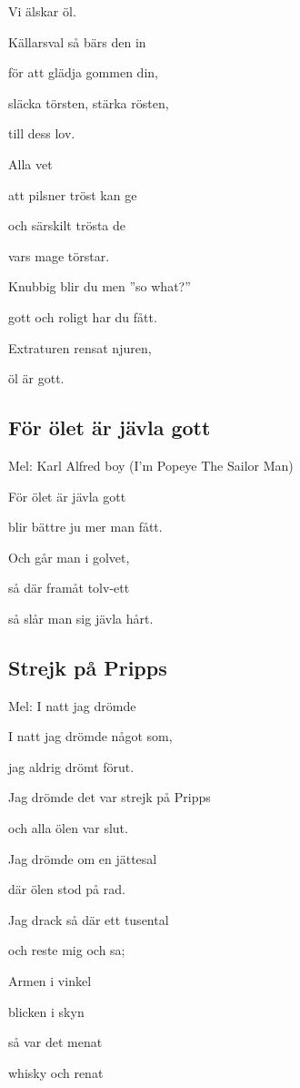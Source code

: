 Vi älskar öl.\bigskip

Källarsval så bärs den in

för att glädja gommen din,

släcka törsten, stärka rösten,

till dess lov.\bigskip

Alla vet

att pilsner tröst kan ge

och särskilt trösta de

vars mage törstar.\bigskip

Knubbig blir du men ”so what?”

gott och roligt har du fått.

Extraturen rensat njuren,

öl är gott. 

\subsection{\textbf{För ölet är jävla gott }}

Mel: Karl Alfred boy (I'm Popeye The Sailor Man)\bigskip

För ölet är jävla gott

blir bättre ju mer man fått.

Och går man i golvet,

så där framåt tolv-ett

så slår man sig jävla hårt.

\subsection{\textbf{Strejk på Pripps}}

Mel: I natt jag drömde\bigskip

I natt jag drömde något som,

jag aldrig drömt förut.

Jag drömde det var strejk på Pripps

och alla ölen var slut.\bigskip

Jag drömde om en jättesal

där ölen stod på rad.

Jag drack så där ett tusental

och reste mig och sa;\bigskip

Armen i vinkel

blicken i skyn

så var det menat

whisky och renat

